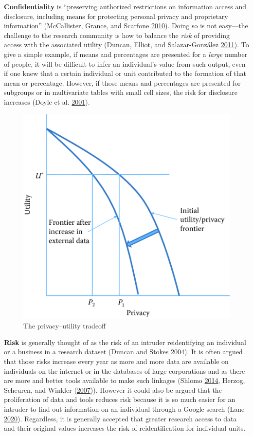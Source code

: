 \documentclass[]{krantz}
\begin{document}
\textbf{Confidentiality} is ``preserving authorized restrictions on
information access and disclosure, including means for protecting
personal privacy and proprietary information'' (McCallister, Grance, and
Scarfone \protect\hyperlink{ref-mccallister2010sp}{2010}). Doing so is
not easy---the challenge to the research community is how to balance the
\emph{risk} of providing access with the associated utility (Duncan,
Elliot, and Salazar-González
\protect\hyperlink{ref-duncanstatistical}{2011}). To give a simple
example, if means and percentages are presented for a \emph{large}
number of people, it will be difficult to infer an individual's value
from such output, even if one knew that a certain individual or unit
contributed to the formation of that mean or percentage. However, if
those means and percentages are presented for subgroups or in
multivariate tables with small cell sizes, the risk for disclosure
increases (Doyle et al.
\protect\hyperlink{ref-doyle2001confidentiality}{2001}).

\begin{figure}

{\centering \includegraphics[width=0.7\linewidth]{ChapterPrivacy/figures/fig11-1} 

}

\caption{The privacy--utility tradeoff}\label{fig:fig11-1}
\end{figure}

\textbf{Risk} is generally thought of as the risk of an intruder
reidentifying an individual or a business in a research dataset (Duncan
and Stokes \protect\hyperlink{ref-duncan2004disclosure}{2004}). It is
often argued that those risks increase every year as more and more data
are available on individuals on the internet or in the databases of
large corporations and as there are more and better tools available to
make such linkages (Shlomo
\protect\hyperlink{ref-shlomo2014probabilistic}{2014}, Herzog, Scheuren,
and Winkler (\protect\hyperlink{ref-herzog2007data}{2007})). However it
could also be argued that the proliferation of data and tools reduces
risk because it is so much easier for an intruder to find out
information on an individual through a Google search (Lane
\protect\hyperlink{ref-Lane2020}{2020}). Regardless, it is generally
accepted that greater research access to data and their original values
increases the risk of reidentification for individual units.
\end{document}
